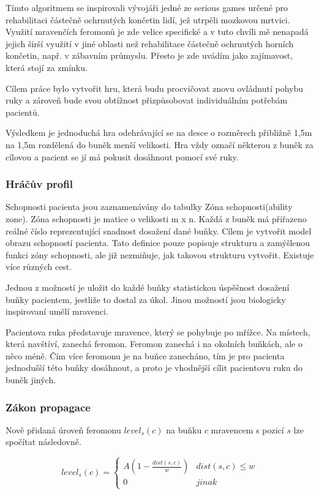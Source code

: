 Tímto algoritmem se inspirovali vývojáři jedné ze serious games určené pro rehabilitaci částečně ochrnutých končetin lidí, jež utrpěli mozkovou mrtvici\cite{26poststroke}. Využití mravenčích feromonů je zde velice specifické a v tuto chvíli mě nenapadá jejich širší využití v jiné oblasti než rehabilitace částečně ochrnutých horních končetin, např. v zábavním průmyslu. Přesto je zde uvádím jako zajímavost, která stojí za zmínku.

Cílem práce bylo vytvořit hru, která budu procvičovat znovu ovládnutí pohybu ruky a zároveň bude svou obtížnost přizpůsobovat individuálním potřebám pacientů.

Výsledkem je jednoduchá hra odehrávající se na desce o rozměrech přibližně 1,5m na 1,5m rozdělená do buněk menší velikosti. Hra vždy označí některou z buněk za cílovou a pacient se jí má pokusit dosáhnout pomocí své ruky.

\subsubsection{Hráčův profil}

Schopnosti pacienta jsou zaznamenávány do tabulky Zóna schopnosti(ability zone). Zóna schopnosti je matice o velikosti m x n. Každá z buněk má přiřazeno reálné číslo reprezentující snadnost dosažení dané buňky. Cílem je vytvořit model obrazu schopností pacienta.
Tato definice pouze popisuje strukturu a zamýšlenou funkci zóny schopnosti, ale již nezmiňuje, jak takovou strukturu vytvořit. Existuje více různých cest.

Jednou z možností je uložit do každé buňky statistickou úspěšnost dosažení buňky pacientem, jestliže to dostal za úkol. Jinou možností jsou biologicky inspirovaní umělí mravenci.

Pacientova ruka představuje mravence, který se pohybuje po mřížce. Na místech, která navštíví, zanechá feromon. Feromon zanechá i na okolních buňkách, ale o něco méně. Čím více feromonu je na buňce zanecháno, tím je pro pacienta jednodušší této buňky dosáhnout, a proto je vhodnější cílit pacientovu ruku do buněk jiných.

\subsubsection{Zákon propagace}

Nově přidaná úroveň feromonu $level_s(c)$ na buňku $c$ mravencem s pozicí $s$ lze spočítat následovně.


\begin{equation}
	level_s(c)= \begin{cases}
											  A(1-\frac{dist(s, c)}{w}) & dist(s, c) \leq w \\
												0 & jinak
										 \end{cases}
\end{equation}

